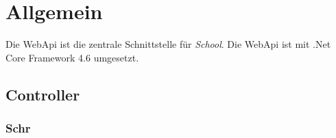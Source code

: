 \section{Allgemein}
Die WebApi ist die zentrale Schnittstelle f\"ur \textit{School}. Die WebApi ist mit .Net Core Framework 4.6 umgesetzt.

\subsection{Controller}
\subsubsection{Schr}